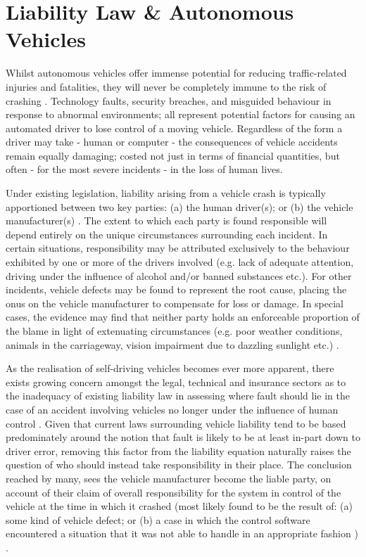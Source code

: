 \documentclass[conference]{IEEEtran}
\begin{document}
\section{Liability Law \& Autonomous Vehicles}

Whilst autonomous vehicles offer immense potential for reducing traffic-related injuries and fatalities, they will never be completely immune to the risk of crashing \cite{marchant}. Technology faults, security breaches, and misguided behaviour in response to abnormal environments; all represent potential factors for causing an automated driver to lose control of a moving vehicle. Regardless of the form a driver may take - human or computer - the consequences of vehicle accidents remain equally damaging; costed not just in terms of financial quantities, but often - for the most severe incidents - in the loss of human lives. 

Under existing legislation, liability arising from a vehicle crash is typically apportioned between two key parties: (a) the human driver(s); or (b) the vehicle manufacturer(s) \cite{marchant}. The extent to which each party is found responsible will depend entirely on the unique circumstances surrounding each incident. In certain situations, responsibility may be attributed exclusively to the behaviour exhibited by one or more of the drivers involved (e.g. lack of adequate attention, driving under the influence of alcohol and/or banned substances etc.). For other incidents, vehicle defects may be found to represent the root cause, placing the onus on the vehicle manufacturer to compensate for loss or damage. In special cases, the evidence may find that neither party holds an enforceable proportion of the blame in light of extenuating circumstances (e.g. poor weather conditions, animals in the carriageway, vision impairment due to dazzling sunlight etc.) \cite{licence-to-skill}. 

As the realisation of self-driving vehicles becomes ever more apparent, there exists growing concern amongst the legal, technical and insurance sectors as to the inadequacy of existing liability law in assessing where fault should lie in the case of an accident involving vehicles no longer under the influence of human control \cite{marchant} \cite{duffy}. Given that current laws surrounding vehicle liability tend to be based predominately around the notion that fault is likely to be at least in-part down to driver error, removing this factor from the liability equation naturally raises the question of who should instead take responsibility in their place. The conclusion reached by many, sees the vehicle manufacturer become the liable party, on account of their claim of overall responsibility for the system in control of the vehicle at the time in which it crashed (most likely found to be the result of: (a) some kind of vehicle defect; or (b) a case in which the control software encountered a situation that it was not able to handle in an appropriate fashion \cite{marchant}) \cite{duffy} \cite{beiker}. 
\end{document}
